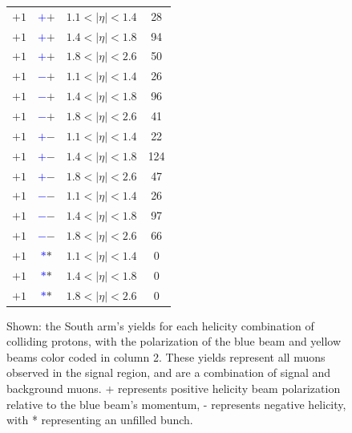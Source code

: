 \begin{figure}
\begin{minipage}[c]{0.67\textwidth}
\begin{tabular}{cccc}
      $+1$ &\textbf{\textcolor{blue}{$+$}\textcolor{ucrgold}{$+$}} & $1.1 <\vert\eta\vert< 1.4$ & 28 \\
      $+1$ &\textbf{\textcolor{blue}{$+$}\textcolor{ucrgold}{$+$}} & $1.4 <\vert\eta\vert< 1.8$ & 94 \\
      $+1$ &\textbf{\textcolor{blue}{$+$}\textcolor{ucrgold}{$+$}} & $1.8 <\vert\eta\vert< 2.6$ & 50 \\
      $+1$ &\textbf{\textcolor{blue}{$-$}\textcolor{ucrgold}{$+$}} & $1.1 <\vert\eta\vert< 1.4$ & 26 \\
      $+1$ &\textbf{\textcolor{blue}{$-$}\textcolor{ucrgold}{$+$}} & $1.4 <\vert\eta\vert< 1.8$ & 96 \\
      $+1$ &\textbf{\textcolor{blue}{$-$}\textcolor{ucrgold}{$+$}} & $1.8 <\vert\eta\vert< 2.6$ & 41 \\
      $+1$ &\textbf{\textcolor{blue}{$+$}\textcolor{ucrgold}{$-$}} & $1.1 <\vert\eta\vert< 1.4$ & 22 \\
      $+1$ &\textbf{\textcolor{blue}{$+$}\textcolor{ucrgold}{$-$}} & $1.4 <\vert\eta\vert< 1.8$ & 124 \\
      $+1$ &\textbf{\textcolor{blue}{$+$}\textcolor{ucrgold}{$-$}} & $1.8 <\vert\eta\vert< 2.6$ & 47 \\
      $+1$ &\textbf{\textcolor{blue}{$-$}\textcolor{ucrgold}{$-$}} & $1.1 <\vert\eta\vert< 1.4$ & 26 \\
      $+1$ &\textbf{\textcolor{blue}{$-$}\textcolor{ucrgold}{$-$}} & $1.4 <\vert\eta\vert< 1.8$ & 97 \\
      $+1$ &\textbf{\textcolor{blue}{$-$}\textcolor{ucrgold}{$-$}} & $1.8 <\vert\eta\vert< 2.6$ & 66 \\
      $+1$ &\textbf{\textcolor{blue}{$*$}\textcolor{ucrgold}{$*$}} & $1.1 <\vert\eta\vert< 1.4$ & 0 \\
      $+1$ &\textbf{\textcolor{blue}{$*$}\textcolor{ucrgold}{$*$}} & $1.4 <\vert\eta\vert< 1.8$ & 0 \\
      $+1$ &\textbf{\textcolor{blue}{$*$}\textcolor{ucrgold}{$*$}} & $1.8 <\vert\eta\vert< 2.6$ & 0 \\
      \bottomrule
    \end{tabular}
  \end{minipage}\hfill
  \begin{minipage}[c]{0.3\textwidth}
    \caption{
      Shown: the South arm's yields for each helicity combination of colliding
      protons, with the polarization of the blue beam and yellow beams color
      coded in column 2. These yields represent all muons observed in the signal
      region, and are a combination of signal and background muons. + represents
      positive helicity beam polarization relative to the blue beam's momentum,
      - represents negative helicity, with * representing an unfilled bunch.
    }
    \label{tab:south_sorted_muons_eta_bins}
  \end{minipage}
\end{figure}

